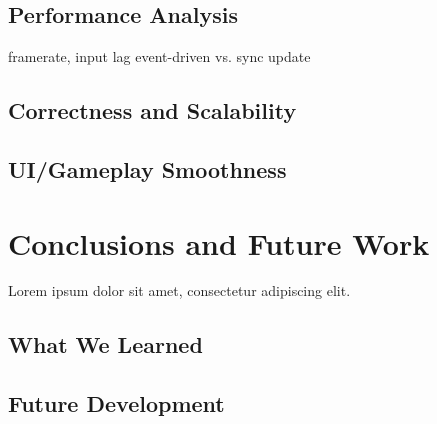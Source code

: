 \documentclass[conference]{IEEEtran}
\begin{document}
\subsection{Performance Analysis}
framerate, input lag event-driven vs. sync update

\subsection{Correctness and Scalability}

\subsection{UI/Gameplay Smoothness}


\section{Conclusions and Future Work}
\label{sec:conclusions}

Lorem ipsum dolor sit amet, consectetur adipiscing elit.

\subsection{What We Learned}

\subsection{Future Development}
\end{document}

